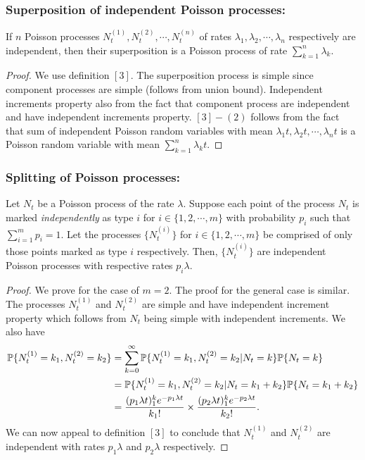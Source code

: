 \documentclass[all-lectures.tex]{subfiles}
\begin{document}
\subsubsection*{Superposition of independent Poisson processes:}
\begin{thm}
If $n$ Poisson processes $N_t^{(1)},N_t^{(2)},\cdots,N_t^{(n)}$ of rates $\lambda_1,\lambda_2,\cdots,\lambda_n$ respectively are independent, then their superposition is a Poisson process of rate $\sum_{k=1}^n \lambda_k$.
\end{thm}
\begin{proof}
We use definition $[3]$. The superposition process is simple since component processes are simple (follows from union bound). Independent increments property also from the fact that component process are independent and have independent increments property. $[3]-(2)$ follows from the fact that sum of independent Poisson random variables with mean $\lambda_1 t, \lambda_2 t,\cdots , \lambda_n t$ is a Poisson random variable with mean $\sum_{k=1}^n \lambda_k t$. 
\end{proof}

\subsubsection*{Splitting of Poisson processes:}
\begin{thm}
Let $N_t$ be a Poisson process of the rate $\lambda$. Suppose each point of the process $N_t$ is marked \textit{independently} as type $i$ for $i \in \{1,2,\cdots,m\}$ with probability $p_i$ such that $\sum_{i=1}^m p_i = 1$. Let the processes $\{N_t^{(i)}\}$ for $i \in \{1,2,\cdots,m\}$ be comprised of only those points marked as type $i$ respectively. Then,  $\{N_t^{(i)}\}$ are independent  Poisson processes with respective rates $p_i \lambda$.
\end{thm}
\begin{proof}
We prove for the case of $m=2$. The proof for the general case is similar. The processes $N_t^{(1)}$ and $N_t^{(2)}$ are simple and have independent increment property which follows from $N_t$ being simple with independent increments. We also have
\begin{align*}
\P\{N_{t}^{(1)} = k_1, N_t^{(2)} = k_2\} &=  \sum_{k=0}^{\infty} \P\{N_{t}^{(1)} = k_1, N_t^{(2)} = k_2 | N_t = k\} \P\{N_t=k\} \\
&= \P\{N_{t}^{(1)} = k_1, N_t^{(2)} = k_2 | N_t = k_1+k_2\} \P\{N_t=k_1+k_2\} \\
&= \frac{(p_1 \lambda t)^k_1 e^{-p_1 \lambda t}}{k_1 !} \times \frac{(p_2 \lambda t)^k_1 e^{-p_2 \lambda t}}{k_2 !}.
\end{align*}
We can now appeal to definition $[3]$ to conclude that $N_t^{(1)}$ and $N_t^{(2)}$ are independent with rates $ p_1 \lambda$ and $p_2 \lambda$ respectively. 
\end{proof}
\end{document}
